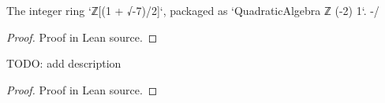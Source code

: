 \begin{lemma}
  \label{lem:theta_prime}
  \leanok
  The integer ring `ℤ[(1 + √-7)/2]`, packaged as `QuadraticAlgebra ℤ (-2) 1`. -/
\end{lemma}
\begin{proof}\leanok
  Proof in Lean source.
\end{proof}

\begin{lemma}
  \label{lem:ufd_associated_dichotomy}
  \leanok
  TODO: add description
\end{lemma}
\begin{proof}\leanok
  Proof in Lean source.
\end{proof}
